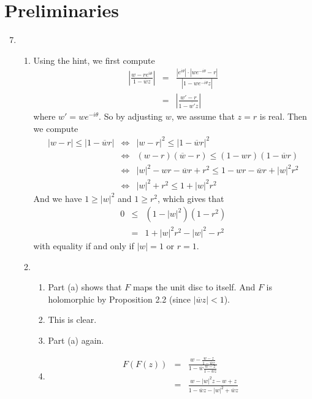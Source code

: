 \documentclass{article}
\begin{document}
\section{Preliminaries}
\begin{enumerate}
  \setcounter{enumi}{6}
\item
  \begin{enumerate}
  \item Using the hint, we first compute
    \begin{eqnarray*}
      \left| \frac{ w - re^{i\theta} }{ 1 - \overline{w}z } \right| &=&
      \frac{ |e^{i\theta}| \cdot | we^{-i\theta} - r | }{ | 1 - \overline{we^{-i\theta}}z |} \\
      &=& \left| \frac{ w' - r }{ 1 - \overline{w'}z } \right|
    \end{eqnarray*} where $w' = we^{-i\theta}$. So by adjusting $w$,
    we assume that $z=r$ is real. Then we compute
    \begin{eqnarray*}
      |w-r| \leq |1-\overline{w}r| &\iff&
      |w-r|^2 \leq |1-\overline{w}r|^2 \\
      &\iff& (w-r)(\overline{w}-r) \leq (1-wr)(1-\overline{w}r) \\
      &\iff& |w|^2 - wr - \overline{w}r + r^2 \leq 1 - wr -
      \overline{w}r + |w|^2r^2 \\
      &\iff& |w|^2 + r^2 \leq 1 + |w|^2r^2
    \end{eqnarray*}
    And we have $1 \geq |w|^2$ and $1 \geq r^2$, which gives that
    \begin{eqnarray*}
      0 &\leq& (1-|w|^2)(1-r^2) \\
      &=& 1 + |w|^2r^2 - |w|^2 - r^2
    \end{eqnarray*}
    with equality if and only if $|w| = 1$ or $r = 1$.
  \item
    \begin{enumerate}
    \item Part (a) shows that $F$ maps the unit disc to itself. And
      $F$ is holomorphic by Proposition 2.2 (since
      $|\overline{w}z|<1$).
    \item This is clear.
    \item Part (a) again.
    \item
      \begin{eqnarray*}
        F(F(z)) &=& \frac{ w -
          \frac{w-z}{1-\overline{w}z}}{1-\overline{w}\frac{w-z}{1-\overline{w}z}}
        \\
        &=& \frac{w-|w|^2z-w+z}{1-\overline{w}z-|w|^2+\overline{w}z} \\

\end{eqnarray*}
\end{enumerate}
\end{enumerate}
\end{enumerate}
\end{document}
